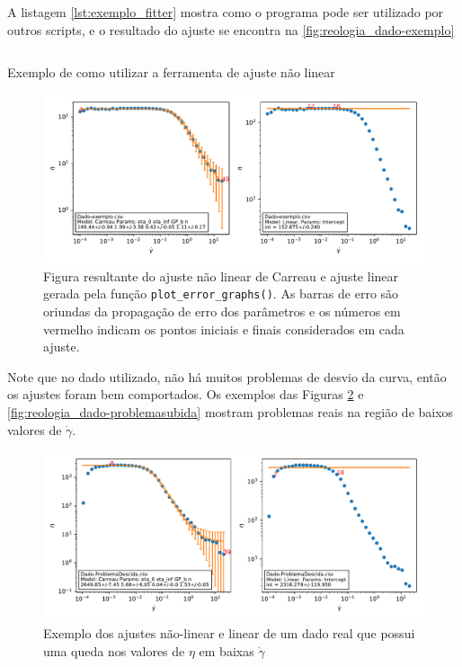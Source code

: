 		A listagem \ref{lst:exemplo_fitter} mostra como o programa pode ser utilizado por outros scripts, e o resultado do ajuste se encontra na \autoref{fig:reologia_dado-exemplo}
		
		\begin{listing}[h]
			\inputminted{python}{./python/uso_fitter.py}
			\caption{Exemplo de como utilizar a ferramenta de ajuste não linear}  %
			\label{lst:exemplo_fitter}
		\end{listing}
		
		\begin{figure}[h]
			\centering
			\includegraphics[width=\textwidth]{imagens/reologia/Dado-exemplo}
			\caption{Figura resultante do ajuste não linear de Carreau e ajuste linear gerada pela função \texttt{plot\_error\_graphs()}. As barras de erro são oriundas da propagação de erro dos parâmetros e os números em vermelho indicam os pontos iniciais e finais considerados em cada ajuste.}
			\label{fig:reologia_dado-exemplo}
		\end{figure}
		
		Note que no dado utilizado, não há muitos problemas de desvio da curva, então os ajustes foram bem comportados. Os exemplos das Figuras \ref{fig:reologia_dado-problemadescida} e \ref{fig:reologia_dado-problemasubida} mostram problemas reais na região de baixos valores de \(\dot{\gamma}\).
		
		\begin{figure}
			\centering
			\includegraphics[width=\textwidth]{imagens/reologia/Dado-ProblemaDescida}
			\caption{Exemplo dos ajustes não-linear e linear de um dado real que possui uma queda nos valores de \(\eta\) em baixas \(\dot{\gamma}\)}
			\label{fig:reologia_dado-problemadescida}
		\end{figure}
		
